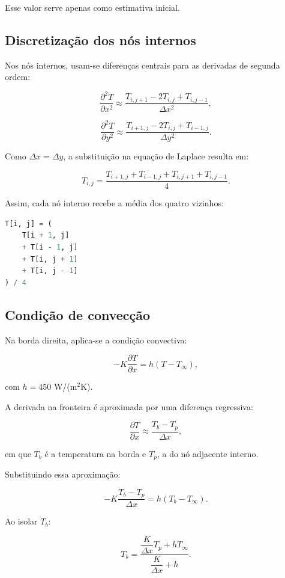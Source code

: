\documentclass[
    12pt,
    oneside,
    a4paper,
    english,
    brazilian,
    chapter=TITLE,
    sumario=tradicional
]{abntex2}
\begin{document}
Esse valor serve apenas como estimativa inicial.

\subsection{Discretização dos nós internos}

Nos nós internos, usam-se diferenças centrais para as derivadas de segunda
ordem:

\[
    \frac{\partial^2 T}{\partial x^2}
    \approx
    \frac{T_{i,j+1}-2T_{i,j}+T_{i,j-1}}{\Delta x^2},
\]

\[
    \frac{\partial^2 T}{\partial y^2}
    \approx
    \frac{T_{i+1,j}-2T_{i,j}+T_{i-1,j}}{\Delta y^2}.
\]

Como $\Delta x=\Delta y$, a substituição na equação de Laplace resulta em:

\[
    T_{i,j}
    =
    \frac{
        T_{i+1,j}
        +
        T_{i-1,j}
        +
        T_{i,j+1}
        +
        T_{i,j-1}
    }{4}.
\]

Assim, cada nó interno recebe a média dos quatro vizinhos:

\begin{lstlisting}[language=Python]
T[i, j] = (
    T[i + 1, j]
    + T[i - 1, j]
    + T[i, j + 1]
    + T[i, j - 1]
) / 4
\end{lstlisting}

\subsection{Condição de convecção}

Na borda direita, aplica-se a condição convectiva:

\[
    -K\frac{\partial T}{\partial x}
    =
    h(T-T_{\infty}),
\]

com $h=450$ W/(m$^2$K).

A derivada na fronteira é aproximada por uma diferença regressiva:

\[
    \frac{\partial T}{\partial x}
    \approx
    \frac{T_b-T_p}{\Delta x},
\]

em que $T_b$ é a temperatura na borda e $T_p$, a do nó adjacente interno.

Substituindo essa aproximação:

\[
    -K\frac{T_b-T_p}{\Delta x}
    =
    h(T_b-T_{\infty}).
\]

Ao isolar $T_b$:

\[
    T_b
    =
    \frac{
        \dfrac{K}{\Delta x}T_p+hT_{\infty}
    }{
        \dfrac{K}{\Delta x}+h
    }.
\]
\end{document}
